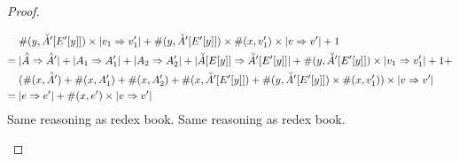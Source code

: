 \documentclass{article}
\begin{document}
\begin{proof}
\begin{byCases}
\begin{align*}
        &\numfvy{\inAm[']{\Ey[']}} \times \size{\val_1 \pstep \val_1'} + 
         \numfvy{\inAm[']{\Ey[']}} \times \numfvx{\val_1'} \times
         \size{\val \pstep \val'} + 1 \\
    =\; &\size{\Ap\pstep\Ap'} + \size{\A_1\pstep\A_1'} + \size{\A_2\pstep\A_2'}+
         \size{\inAm{\Ey}\pstep\inAm[']{\Ey[']}} + 
         \numfvy{\inAm[']{\Ey[']}} \times \size{\val_1 \pstep \val_1'} + 1 + \\
         &(\numfvx{\Ap'}+\numfvx{\A_1'}+\numfvx{\A_2'}+
          \numfvx{\inAm[']{\Ey[']}}+
          \numfvy{\inAm[']{\Ey[']}} \times \numfvx{\val_1'}) 
         \times \size{\val \pstep \val'} \\
    =\; & \size{\e \pstep \e'} + \numfvx{\e'} \times \size{\val \pstep \val'}
  \end{align*}
   Same reasoning as redex book.
   Same reasoning as redex book.
\end{byCases}
\end{proof}






\pagebreak
\end{document}
